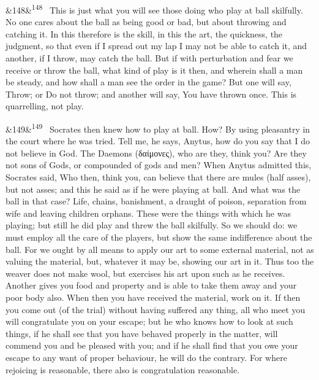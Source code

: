 \documentclass[12pt]{article}
\newcommand{\para}[1][]{\par\noindent\ifx&#1&\else\textsuperscript{\footnotesize #1}~\fi}
\begin{document}
\para[148] This is just what you will see those doing who play at ball skilfully. No one cares about the ball as being good or bad, but about throwing and catching it. In this therefore is the skill, in this the art, the quickness, the judgment, so that even if I spread out my lap I may not be able to catch it, and another, if I throw, may catch the ball. But if with perturbation and fear we receive or throw the ball, what kind of play is it then, and wherein shall a man be steady, and how shall a man see the order in the game? But one will say, Throw; or Do not throw; and another will say, You have thrown once. This is quarrelling, not play.

\para[149] Socrates then knew how to play at ball. How? By using pleasantry in the court where he was tried. Tell me, he says, Anytus, how do you say that I do not believe in God. The Daemons (δαίμονες), who are they, think you? Are they not sons of Gods, or compounded of gods and men? When Anytus admitted this, Socrates said, Who then, think you, can believe that there are mules (half asses), but not asses; and this he said as if he were playing at ball. And what was the ball in that case? Life, chains, banishment, a draught of poison, separation from wife and leaving children orphans. These were the things with which he was playing; but still he did play and threw the ball skilfully. So we should do: we must employ all the care of the players, but show the same indifference about the ball. For we ought by all means to apply our art to some external material, not as valuing the material, but, whatever it may be, showing our art in it. Thus too the weaver does not make wool, but exercises his art upon such as he receives. Another gives you food and property and is able to take them away and your poor body also. When then you have received the material, work on it. If then you come out (of the trial) without having suffered any thing, all who meet you will congratulate you on your escape; but he who knows how to look at such things, if he shall see that you have behaved properly in the matter, will commend you and be pleased with you; and if he shall find that you owe your escape to any want of proper behaviour, he will do the contrary. For where rejoicing is reasonable, there also is congratulation reasonable.
\end{document}
